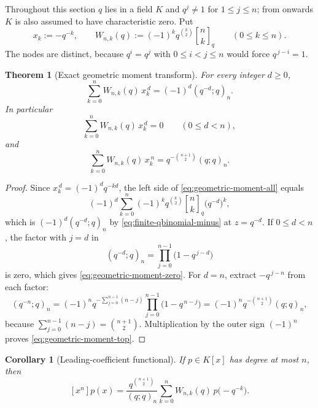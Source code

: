 \documentclass[11pt,oneside,openany]{book}
\newtheorem{theorem}{Theorem}[chapter]
\newtheorem{corollary}[corollary]{Corollary}
\theoremstyle{definition}
\theoremstyle{remark}
\newcommand{\qbinom}[2]{\genfrac{[}{]}{0pt}{}{#1}{#2}_{q}}
\newcommand{\defeq}{\mathrel{:=}}
\begin{document}
Throughout this section $q$ lies in a field $K$ and $q^j\ne1$ for $1\le j\le n$; from  onwards $K$ is also assumed to have characteristic zero.  Put
\begin{equation}\label{eq:reciprocal-nodes-weights}
 x_k\defeq-q^{-k},
 \qquad
 W_{n,k}(q)\defeq(-1)^kq^{\binom k2}\qbinom nk
 \qquad(0\le k\le n).
\end{equation}
The nodes are distinct, because $q^i=q^j$ with $0\le i<j\le n$ would force $q^{\,j-i}=1$.

\begin{theorem}[Exact geometric moment transform]\label{thm:geometric-moment-transform}
For every integer $d\ge0$,
\begin{equation}\label{eq:geometric-moment-all}
 \sum_{k=0}^{n}W_{n,k}(q)\,x_k^{\,d}
 =(-1)^d(q^{-d};q)_n.
\end{equation}
In particular
\begin{equation}\label{eq:geometric-moment-zero}
 \sum_{k=0}^{n}W_{n,k}(q)\,x_k^{\,d}=0
 \qquad(0\le d<n),
\end{equation}
and
\begin{equation}\label{eq:geometric-moment-top}
 \sum_{k=0}^{n}W_{n,k}(q)\,x_k^{\,n}
 =q^{-\binom{n+1}{2}}(q;q)_n.
\end{equation}
\end{theorem}

\begin{proof}
Since $x_k^{\,d}=(-1)^dq^{-kd}$, the left side of \eqref{eq:geometric-moment-all} equals
\[
 (-1)^d\sum_{k=0}^{n}(-1)^kq^{\binom k2}\qbinom nk\bigl(q^{-d}\bigr)^{k},
\]
which is $(-1)^d(q^{-d};q)_n$ by \eqref{eq:finite-qbinomial-minus} at $z=q^{-d}$.  If $0\le d<n$, the factor with $j=d$ in
\[
 (q^{-d};q)_n=\prod_{j=0}^{n-1}\bigl(1-q^{\,j-d}\bigr)
\]
is zero, which gives \eqref{eq:geometric-moment-zero}.  For $d=n$, extract $-q^{\,j-n}$ from each factor:
\[
 (q^{-n};q)_n
 =(-1)^nq^{-\sum_{j=0}^{n-1}(n-j)}\prod_{j=0}^{n-1}\bigl(1-q^{\,n-j}\bigr)
 =(-1)^nq^{-\binom{n+1}{2}}(q;q)_n,
\]
because $\sum_{j=0}^{n-1}(n-j)=\binom{n+1}{2}$.  Multiplication by the outer sign $(-1)^n$ proves \eqref{eq:geometric-moment-top}.
\end{proof}

\begin{corollary}[Leading-coefficient functional]\label{cor:reciprocal-leading-coefficient}
If $p\in K[x]$ has degree at most $n$, then
\begin{equation}\label{eq:reciprocal-leading-functional}
 [x^n]p(x)
 =\frac{q^{\binom{n+1}{2}}}{(q;q)_n}
  \sum_{k=0}^{n}W_{n,k}(q)\,p\bigl(-q^{-k}\bigr).
\end{equation}
\end{corollary}
\end{document}
